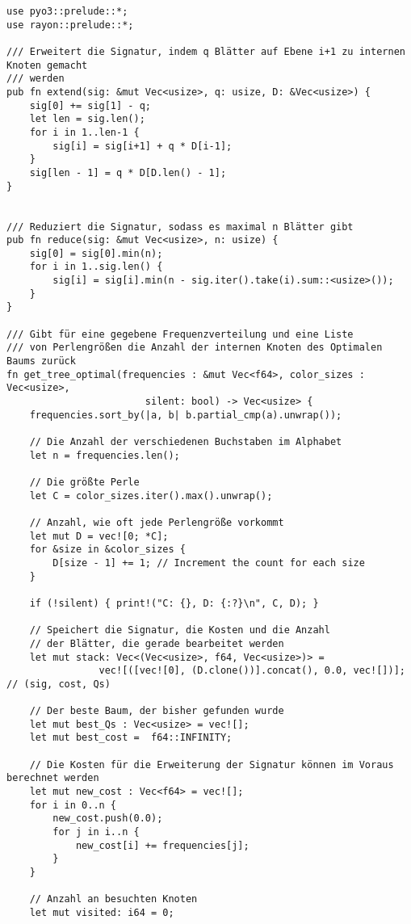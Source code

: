 \documentclass[a4paper,10pt,ngerman]{scrartcl}
\begin{document}
    \begin{verbatim}
use pyo3::prelude::*;
use rayon::prelude::*;

/// Erweitert die Signatur, indem q Blätter auf Ebene i+1 zu internen Knoten gemacht
/// werden
pub fn extend(sig: &mut Vec<usize>, q: usize, D: &Vec<usize>) {
    sig[0] += sig[1] - q;
    let len = sig.len();
    for i in 1..len-1 {
        sig[i] = sig[i+1] + q * D[i-1];
    }
    sig[len - 1] = q * D[D.len() - 1];
}


/// Reduziert die Signatur, sodass es maximal n Blätter gibt
pub fn reduce(sig: &mut Vec<usize>, n: usize) {
    sig[0] = sig[0].min(n);
    for i in 1..sig.len() {
        sig[i] = sig[i].min(n - sig.iter().take(i).sum::<usize>());
    }
}

/// Gibt für eine gegebene Frequenzverteilung und eine Liste
/// von Perlengrößen die Anzahl der internen Knoten des Optimalen Baums zurück
fn get_tree_optimal(frequencies : &mut Vec<f64>, color_sizes : Vec<usize>,
                        silent: bool) -> Vec<usize> {
    frequencies.sort_by(|a, b| b.partial_cmp(a).unwrap());

    // Die Anzahl der verschiedenen Buchstaben im Alphabet
    let n = frequencies.len();

    // Die größte Perle
    let C = color_sizes.iter().max().unwrap();

    // Anzahl, wie oft jede Perlengröße vorkommt
    let mut D = vec![0; *C];
    for &size in &color_sizes {
        D[size - 1] += 1; // Increment the count for each size
    }

    if (!silent) { print!("C: {}, D: {:?}\n", C, D); }

    // Speichert die Signatur, die Kosten und die Anzahl
    // der Blätter, die gerade bearbeitet werden
    let mut stack: Vec<(Vec<usize>, f64, Vec<usize>)> =
                vec![([vec![0], (D.clone())].concat(), 0.0, vec![])]; // (sig, cost, Qs)

    // Der beste Baum, der bisher gefunden wurde
    let mut best_Qs : Vec<usize> = vec![];
    let mut best_cost =  f64::INFINITY;

    // Die Kosten für die Erweiterung der Signatur können im Voraus berechnet werden
    let mut new_cost : Vec<f64> = vec![];
    for i in 0..n {
        new_cost.push(0.0);
        for j in i..n {
            new_cost[i] += frequencies[j];
        }
    }

    // Anzahl an besuchten Knoten
    let mut visited: i64 = 0;


\end{verbatim}
\end{document}
